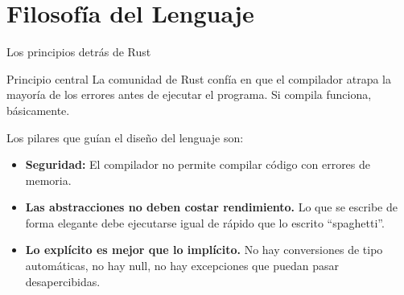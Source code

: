 \documentclass[11pt, aspectratio=169]{beamer}
\begin{document}
	\section{Filosofía del Lenguaje}

	\begin{frame}{Los principios detrás de Rust}
		\begin{block}{Principio central}
			La comunidad de Rust confía en que el compilador atrapa la mayoría de los errores antes de ejecutar el programa. Si compila funciona, básicamente.
		\end{block}
		
		\vspace{0.3cm}
		Los pilares que guían el diseño del lenguaje son:
		\begin{itemize}
			\item \textbf{Seguridad:} El compilador no permite compilar código con errores de memoria.
			\item \textbf{Las abstracciones no deben costar rendimiento.} Lo que se escribe de forma elegante debe ejecutarse igual de rápido que lo escrito ``spaghetti''.
			\item \textbf{Lo explícito es mejor que lo implícito.} No hay conversiones de tipo automáticas, no hay null, no hay excepciones que puedan pasar desapercibidas.
		\end{itemize}
	\end{frame}
\end{document}
